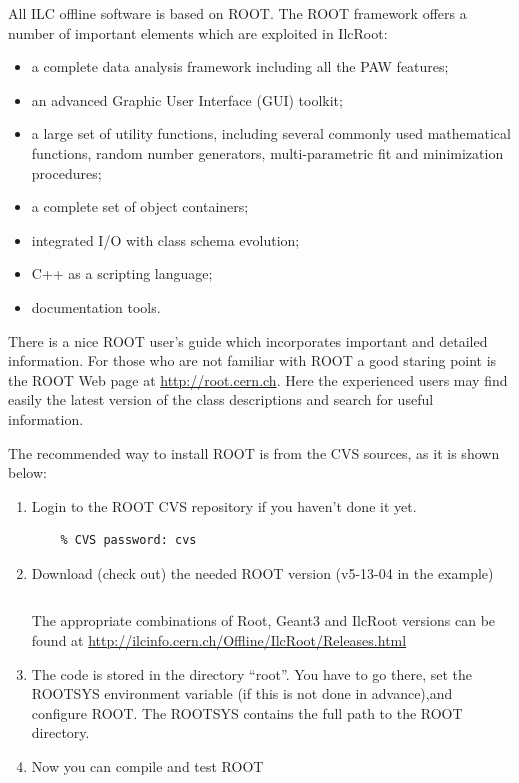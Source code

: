 \documentclass[12pt,a4paper,twoside]{article}
\begin{document}
All ILC offline software is based on ROOT\cite{ROOT}. The ROOT
framework offers a number of important elements which are exploited in
IlcRoot:

\begin{itemize}
\item a complete data analysis framework including all the PAW
  features;
\item an advanced Graphic User Interface (GUI) toolkit;
\item a large set of utility functions, including several commonly
  used mathematical functions, random number generators,
  multi-parametric fit and minimization procedures;
\item a complete set of object containers; 
\item integrated I/O with class schema evolution;
\item C++ as a scripting language;
\item documentation tools.
\end{itemize}
There is a nice ROOT user's guide which incorporates important and
detailed information. For those who are not familiar with ROOT a good
staring point is the ROOT Web page at \url{http://root.cern.ch}. Here
the experienced users may find easily the latest version of the class
descriptions and search for useful information.

\noindent
The recommended way to install ROOT is from the CVS sources, as it is
shown below:

\begin{enumerate}
\item Login to the ROOT CVS repository if you haven't done it yet.
  \begin{lstlisting}[language=sh]
    % cvs -d :pserver:cvs@root.cern.ch:/user/cvs login
    % CVS password: cvs
  \end{lstlisting}

\item Download (check out) the needed ROOT version (v5-13-04 in the example)
  \begin{lstlisting}[language=sh]
    % cvs -d :pserver:cvs@root.cern.ch:/user/cvs co -r v5-13-04 root
  \end{lstlisting}
  The appropriate  combinations of  Root, Geant3 and  IlcRoot versions
  can be found at
  \url{http://ilcinfo.cern.ch/Offline/IlcRoot/Releases.html}

\item The code is stored in the directory ``root''. You have to go
  there, set the ROOTSYS environment variable (if this is not done in
  advance),and configure ROOT. The ROOTSYS contains the full path to
  the ROOT directory.

  

\item Now you can compile and test ROOT
  

\end{enumerate}
\end{document}

